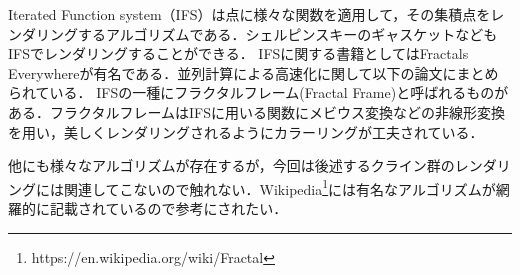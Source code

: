 Iterated Function system（IFS）は点に様々な関数を適用して，その集積点をレンダリングするアルゴリズムである．シェルピンスキーのギャスケットなどもIFSでレンダリングすることができる．
IFSに関する書籍としてはFractals Everywhere\cite{fractalsEverywhere}が有名である．並列計算による高速化に関して以下の論文にまとめられている\cite{highPerformanceIFS}\cite{GPUIFS}．
IFSの一種にフラクタルフレーム(Fractal Frame)\cite{fractalFrame}と呼ばれるものがある．フラクタルフレームはIFSに用いる関数にメビウス変換などの非線形変換を用い，美しくレンダリングされるようにカラーリングが工夫されている．

他にも様々なアルゴリズムが存在するが，今回は後述するクライン群のレンダリングには関連してこないので触れない．Wikipedia\footnote{https://en.wikipedia.org/wiki/Fractal}には有名なアルゴリズムが網羅的に記載されているので参考にされたい．
